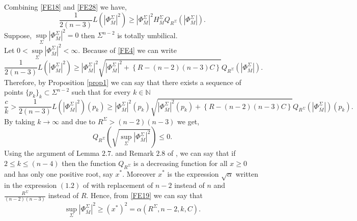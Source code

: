 \documentclass[11pt]{amsart}
\numberwithin{equation}{section}
\begin{document}
Combining \eqref{FE18} and \eqref{FE28} we have,
\begin{equation}\label{FE20}
    \frac{1}{2(n-3)} L\left(\left|\Phi^{\Sigma}_{\overline{M}}\right|^2\right)\ge \left|\Phi^{\Sigma}_{\overline{M}}\right|^2H^{\Sigma}_{\overline{M}}  Q_{R^{\Sigma}}\left(\left|\Phi^{\Sigma}_{\overline{M}}\right|\right).
\end{equation}
Suppose, $\sup\limits_{\Sigma}\left|\Phi^{\Sigma}_{\overline{M}}\right|^2=0$ then $\Sigma^{n-2}$ is totally umbilical.\\
Let $0<\sup\limits_{\Sigma} \left|\Phi^{\Sigma}_{\overline{M}}\right|^2< \infty$. 
Because of \eqref{FE4} we can write 
\begin{equation}
    \frac{1}{2(n-3)} L\left(\left|\Phi^{\Sigma}_{\overline{M}}\right|^2\right)\ge \left|\Phi^{\Sigma}_{\overline{M}}\right|^2 \sqrt{\left|\Phi^{\Sigma}_{\overline{M}}\right|^2+\left\{R-(n-2)(n-3)C\right\}}  Q_{R^{\Sigma}}\left(\left|\Phi^{\Sigma}_{\overline{M}}\right|\right).
\end{equation}
Therefore, by Proposition \ref{prop1} we can say that there exists a sequence of points $\{p_k\}_k\subset \Sigma^{n-2}$ such that for every $k\in \mathbb{N}$
\begin{equation}
    \frac{c}{k}>\frac{1}{2(n-3)} L\left(\left|\Phi^{\Sigma}_{\overline{M}}\right|^2\right)(p_k)\ge \left|\Phi^{\Sigma}_{\overline{M}}\right|^2(p_k) \sqrt{\left|\Phi^{\Sigma}_{\overline{M}}\right|^2(p_k)+\left\{R-(n-2)(n-3)C\right\}}  Q_{R^{\Sigma}}\left(\left|\Phi^{\Sigma}_{\overline{M}}\right|\right)(p_k).
\end{equation}
By taking $k\rightarrow \infty$ and due to $R^{\Sigma}>(n-2)(n-3)$ we get,
\begin{equation}\label{FE19}
     Q_{R^{\Sigma}}\left(\sqrt{\sup_{\Sigma}\left|\Phi^{\Sigma}_{\overline{M}}\right|^2}\right)\le 0.
\end{equation}
Using the argument of Lemma $2.7.$ and Remark $2.8$ of \cite{AMP}, we can say that if $2\le k\le (n-4)$ then the function $Q_{R^{\Sigma}}$ is a decreasing function for all $x\ge 0$ and has only one positive root, say $x^{*}$. Moreover $x^{*}$ is the expression $\sqrt{\alpha}$ written in the expression $(1.2)$ of \cite{AMP} with replacement of $n-2$ instead of $n$ and $\frac{R^{\Sigma}}{(n-2)(n-3)}$ instead of $R$. Hence, from \eqref{FE19} we can say that 
\begin{equation}
    \sup_{\Sigma} \left|\Phi^{\Sigma}_{\overline{M}}\right|^2\ge (x^{*})^2= \alpha\left(R^{\Sigma}, n-2, k, C\right).
\end{equation}
\end{document}
